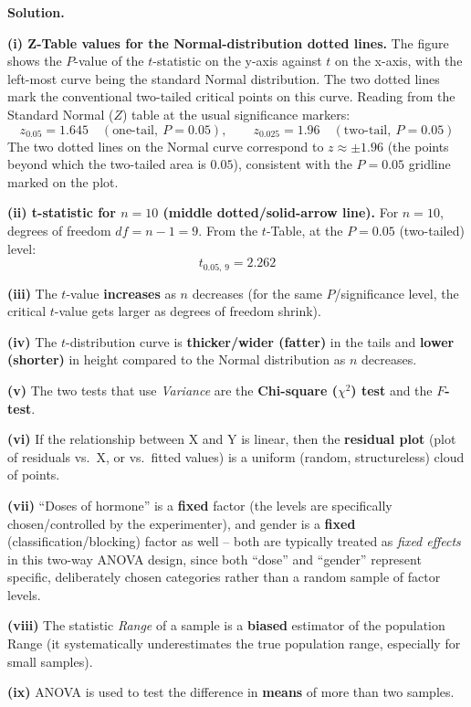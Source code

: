 \documentclass[11pt]{article}
\newcommand{\soln}{\par\noindent\textcolor{acolor}{\textbf{Solution.}}\quad}
\begin{document}
\soln

\textbf{(i) Z-Table values for the Normal-distribution dotted lines.}
The figure shows the $P$-value of the $t$-statistic on the y-axis against $t$ on the x-axis, with the left-most curve being the standard Normal distribution. The two dotted lines mark the conventional two-tailed critical points on this curve. Reading from the Standard Normal ($Z$) table at the usual significance markers:
\[
z_{0.05} = 1.645 \quad (\text{one-tail}, \ P=0.05), \qquad z_{0.025} = 1.96 \quad (\text{two-tail}, \ P=0.05)
\]
The two dotted lines on the Normal curve correspond to $z \approx \pm 1.96$ (the points beyond which the two-tailed area is $0.05$), consistent with the $P=0.05$ gridline marked on the plot.

\textbf{(ii) t-statistic for $n=10$ (middle dotted/solid-arrow line).}
For $n=10$, degrees of freedom $df = n-1 = 9$. From the $t$-Table, at the $P=0.05$ (two-tailed) level:
\[
\boxed{t_{0.05,\,9} = 2.262}
\]

\textbf{(iii)} The $t$-value \textbf{increases} as $n$ decreases (for the same $P$/significance level, the critical $t$-value gets larger as degrees of freedom shrink).

\textbf{(iv)} The $t$-distribution curve is \textbf{thicker/wider (fatter)} in the tails and \textbf{lower (shorter)} in height compared to the Normal distribution as $n$ decreases.

\textbf{(v)} The two tests that use \emph{Variance} are the \textbf{Chi-square ($\chi^2$) test} and the \textbf{$F$-test}.

\textbf{(vi)} If the relationship between X and Y is linear, then the \textbf{residual plot} (plot of residuals vs.\ X, or vs.\ fitted values) is a uniform (random, structureless) cloud of points.

\textbf{(vii)} ``Doses of hormone'' is a \textbf{fixed} factor (the levels are specifically chosen/controlled by the experimenter), and gender is a \textbf{fixed} (classification/blocking) factor as well -- both are typically treated as \emph{fixed effects} in this two-way ANOVA design, since both ``dose'' and ``gender'' represent specific, deliberately chosen categories rather than a random sample of factor levels.

\textbf{(viii)} The statistic \emph{Range} of a sample is a \textbf{biased} estimator of the population Range (it systematically underestimates the true population range, especially for small samples).

\textbf{(ix)} ANOVA is used to test the difference in \textbf{means} of more than two samples.
\end{document}
